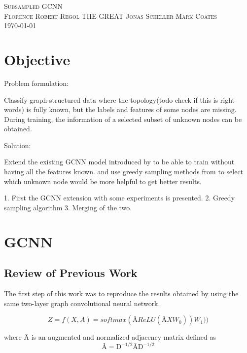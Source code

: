 \documentclass{article}
\begin{document}

		
	\begin{center}

		\textsc{\huge Subsampled GCNN}\\[0.5cm] 
		\textsc{\large Florence Robert-Regol \hfill THE GREAT Jonas Scheller  \hfill Mark Coates}\\
		\textsc{\today}\\[0.5cm] 
		
	\end{center}


\pagestyle{fancy}
\rhead{\today}

\section*{Objective}
Problem formulation:

Classify graph-structured data where the topology(todo check if this is right words) is fully known, but  the labels and features of some nodes are missing. During training, the information of a selected subset of unknown nodes can be obtained.\

Solution:

Extend the existing GCNN model introduced by \citet{kipf2017semi}
 to be able to train without having all the features known.
and use greedy sampling methods from \citet{DBLP:journals/corr/ChamonR17}
 to select which unknown node would be more helpful to get better results. \
 
1. First the GCNN extension with some experiments is presented. 2. Greedy sampling algorithm  
3. Merging of the two.

\section*{GCNN}
\subsection*{Review of Previous Work}
The first step of this work was to reproduce the results obtained by \citet{kipf2017semi} using the same two-layer graph
convolutional neural network.

\begin{equation}
Z = f(X, A) = softmax(\text{\^{A}} ReLU(\text{\^{A}}XW_0))W_1))
\end{equation}

where \^{A} is an augmented and normalized adjacency matrix defined as
\begin{equation}
\text{\^{A}} = \text{\~{D}}^{-1/2}\text{\~{A}}\text{\~{D}}^{-1/2}
\end{equation}
\end{document}
